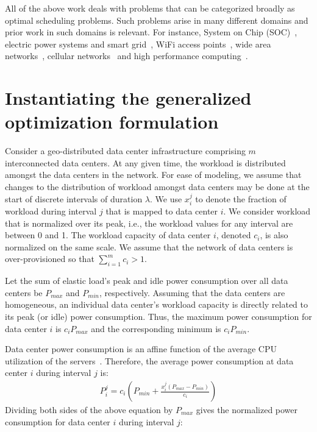 All of the above work deals with problems that can be categorized broadly as optimal scheduling problems. Such problems arise in many different domains and prior work in such domains is relevant. For instance, System on Chip (SOC)~\cite{Fang:2011:COP:1995896.1995940}, electric power systems and smart grid~\cite{Javed:2008:ULP:1485753.1485792,Logenthiran2011138,Celli:2001:PICA,FahadJavedAdOpt.SASO.2009.26}, WiFi access points~\cite{Marsan:2010:SAM:1791314.1791340}, wide area networks~\cite{Cavdar:2011:ECOC}, cellular networks~\cite{Peng:2011:TPS:2030613.2030628} and high performance computing~\cite{Lee:ServerConsolidation:2011:Globecom,Pinheiro01loadbalancing,Yao:DCPowerReduction:2012:INFOCOM,Herodotou:Starfish:2011:CIDR,Herodotou:2011:NOS:2038916.2038934,Aikema:ElecCostHPC:2011:ISSST}.

\section{Instantiating the generalized optimization formulation}\label{sec:case1:instantiating} %
Consider a geo-distributed data center infrastructure
comprising $m$ interconnected data
centers. At any given time, the workload is distributed amongst the data
centers in the network. For ease of modeling, we assume that changes to the distribution of workload amongst data centers may be done at the start of discrete intervals of duration $\lambda$. We use $x_i^j$ to denote the fraction of workload during interval $j$ that is mapped to data center $i$.  We consider workload that is normalized over its peak, i.e., the workload values for any interval are between 0 and 1. The workload capacity of data center $i$, denoted $c_i$, is also normalized on the same scale. We assume that the network of data centers is over-provisioned so that $\sum_{i=1}^m c_i > 1$.

Let the sum of elastic load's peak and idle power consumption over all data centers be $P_{max}$ and $P_{min}$, respectively. Assuming that the data centers are homogeneous, an individual data center's workload capacity is directly related to its peak (or idle) power consumption. Thus, the maximum power consumption for data center $i$ is $c_iP_{max}$ and the corresponding minimum is $c_iP_{min}$. 

Data center power consumption is an affine function of the average CPU utilization of the servers~\cite{Fan:power:ICSA:2007}. Therefore, the average power consumption at data center $i$ during interval $j$ is: 
\begin{align}
P_i^j = c_i \left(P_{min}+\frac{x_i^j\left(P_{max}-P_{min}\right)}{c_i}\right)
\end{align}
Dividing both sides of the above equation by $P_{max}$ gives the normalized power consumption for data center $i$ during interval $j$:

